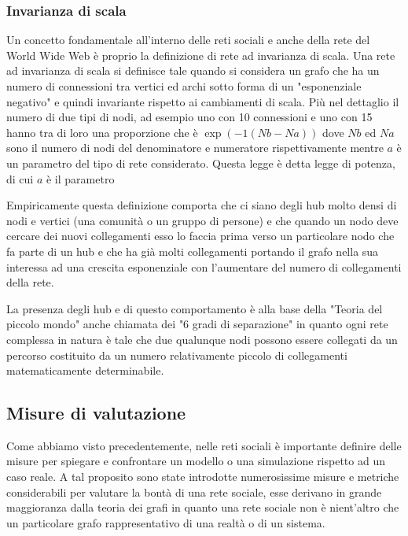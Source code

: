 \documentclass[11pt]{article}
\begin{document}
\subsubsection{Invarianza di scala}
Un concetto fondamentale all'interno delle reti sociali e anche della rete del World Wide Web è proprio la definizione di rete ad invarianza di scala.
Una rete ad invarianza di scala si definisce tale quando si considera un grafo che ha un numero di connessioni tra vertici ed archi sotto forma di un "esponenziale negativo" e quindi invariante rispetto ai cambiamenti di scala.
Più nel dettaglio il numero di due tipi di nodi, ad esempio uno con 10 connessioni e uno con 15 hanno tra di loro una proporzione che è $\exp(-1 (Nb-Na)) $ dove $Nb$ ed $Na$ sono il numero di nodi del denominatore e numeratore rispettivamente mentre $a$ è un parametro del tipo di rete considerato. Questa legge è detta legge di potenza, di cui $a$ è il parametro \cite{ReteInvarianzaScala}

Empiricamente questa definizione comporta che ci siano degli hub molto densi di nodi e vertici (una comunità o un gruppo di persone) e che quando un nodo deve cercare dei nuovi collegamenti esso lo faccia prima verso un particolare nodo che fa parte di un hub e che ha già molti collegamenti portando il grafo nella sua interessa ad una crescita esponenziale con l'aumentare del numero di collegamenti della rete.

La presenza degli hub e di questo comportamento è alla base della "Teoria del piccolo mondo" anche chiamata dei "6 gradi di separazione" in quanto ogni rete complessa in natura è tale che due qualunque nodi possono essere collegati da un percorso costituito da un numero relativamente piccolo di collegamenti matematicamente determinabile. \cite{TeoriaPiccoloMondo}

\subsection{Misure di valutazione}

Come abbiamo visto precedentemente, nelle reti sociali è importante definire delle misure per spiegare e confrontare un modello o una simulazione rispetto ad un caso reale.
A tal proposito sono state introdotte numerosissime misure e metriche considerabili per valutare la bontà di una rete sociale, esse derivano in grande maggioranza dalla teoria dei grafi in quanto una rete sociale non è nient'altro che un particolare grafo rappresentativo di una realtà o di un sistema.
\end{document}
